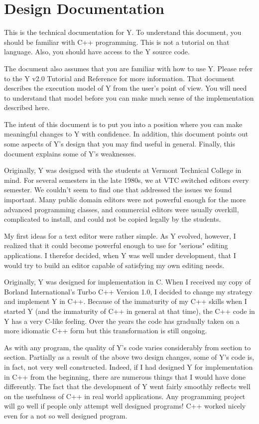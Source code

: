 
\chapter{Design Documentation}

This is the technical documentation for Y. To understand this document, you should be familiar
with C++ programming. This is not a tutorial on that language. Also, you should have access to
the Y source code.

The document also assumes that you are familiar with how to use Y. Please refer to the Y v2.0
Tutorial and Reference for more information. That document describes the execution model of Y
from the user's point of view. You will need to understand that model before you can make much
sense of the implementation described here.

The intent of this document is to put you into a position where you can make meaningful changes
to Y with confidence. In addition, this document points out some aspects of Y's design that you
may find useful in general. Finally, this document explains some of Y's weaknesses.

Originally, Y was designed with the students at Vermont Technical College in mind. For several
semesters in the late 1980s, we at VTC switched editors every semester. We couldn't seem to find
one that addressed the issues we found important. Many public domain editors were not powerful
enough for the more advanced programming classes, and commercial editors were usually overkill,
complicated to install, and could not be copied legally by the students.

My first ideas for a text editor were rather simple. As Y evolved, however, I realized that it
could become powerful enough to use for "serious" editing applications. I therefor decided, when
Y was well under development, that I would try to build an editor capable of satisfying my own
editing needs.

Originally, Y was designed for implementation in C. When I received my copy of Borland
International's Turbo C++ Version 1.0, I decided to change my strategy and implement Y in C++.
Because of the immaturity of my C++ skills when I started Y (and the immaturity of C++ in
general at that time), the C++ code in Y has a very C-like feeling. Over the years the code has
gradually taken on a more idiomatic C++ form but this transformation is still ongoing.

As with any program, the quality of Y's code varies considerably from section to section.
Partially as a result of the above two design changes, some of Y's code is, in fact, not very
well constructed. Indeed, if I had designed Y for implementation in C++ from the beginning,
there are numerous things that I would have done differently. The fact that the development of Y
went fairly smoothly reflects well on the usefulness of C++ in real world applications. Any
programming project will go well if people only attempt well designed programs! C++ worked
nicely even for a not so well designed program.

